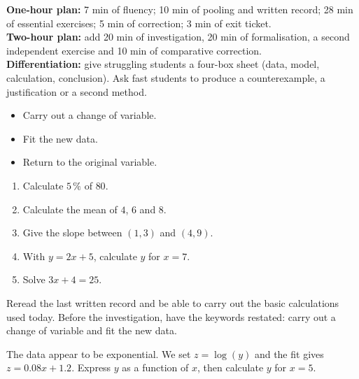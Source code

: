 \ifprof
\begin{methode}
\textbf{One-hour plan:} 7 min of fluency; 10 min of pooling and written record; 28 min of essential exercises; 5 min of correction; 3 min of exit ticket.\\
\textbf{Two-hour plan:} add 20 min of investigation, 20 min of formalisation, a second independent exercise and 10 min of comparative correction.\\
\textbf{Differentiation:} give struggling students a four-box sheet (data, model, calculation, conclusion). Ask fast students to produce a counterexample, a justification or a second method.
\end{methode}
\fi
{}
\begin{objectifs}\begin{itemize}\item Carry out a change of variable.\item Fit the new data.\item Return to the original variable.\end{itemize}\end{objectifs}
\begin{automatismes}\begin{enumerate}\item Calculate $5\,\%$ of $80$. \item Calculate the mean of $4$, $6$ and $8$. \item Give the slope between $(1,3)$ and $(4,9)$. \item With $y=2x+5$, calculate $y$ for $x=7$. \item Solve $3x+4=25$. \end{enumerate}\end{automatismes}
\begin{prerequis}Reread the last written record and be able to carry out the basic calculations used today. Before the investigation, have the keywords restated: carry out a change of variable and fit the new data.\end{prerequis}

\begin{activite}
The data appear to be exponential. We set $z=\log(y)$ and the fit gives $z=0.08x+1.2$. Express $y$ as a function of $x$, then calculate $y$ for $x=5$.

\end{activite}

